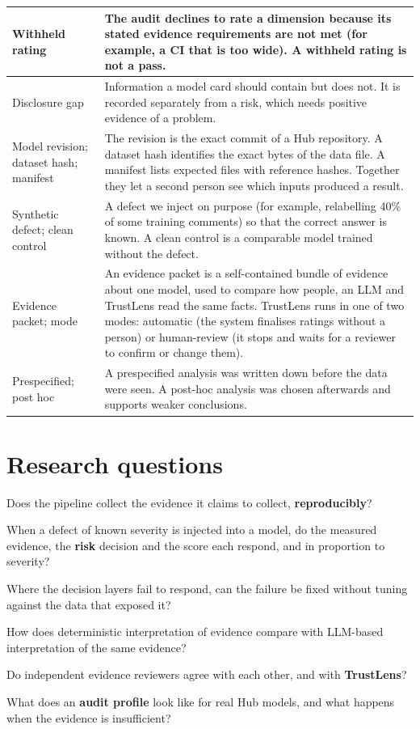 \begin{table}[!htbp]
\begin{tabularx}{\textwidth}{|>{\raggedright\arraybackslash}p{3.1cm}|L|}
Withheld rating & The audit declines to rate a dimension because its stated evidence requirements are not met (for example, a CI that is too wide). A withheld rating is not a pass.\\ \hline
Disclosure gap & Information a model card should contain but does not. It is recorded separately from a risk, which needs positive evidence of a problem.\\ \hline
Model revision; dataset hash; manifest & The revision is the exact commit of a Hub repository. A dataset hash identifies the exact bytes of the data file. A manifest lists expected files with reference hashes. Together they let a second person see which inputs produced a result.\\ \hline
Synthetic defect; clean control & A defect we inject on purpose (for example, relabelling 40\% of some training comments) so that the correct answer is known. A clean control is a comparable model trained without the defect.\\ \hline
Evidence packet; mode & An evidence packet is a self-contained bundle of evidence about one model, used to compare how people, an LLM and TrustLens read the same facts. TrustLens runs in one of two modes: automatic (the system finalises ratings without a person) or human-review (it stops and waits for a reviewer to confirm or change them).\\ \hline
Prespecified; post hoc & A prespecified analysis was written down before the data were seen. A post-hoc analysis was chosen afterwards and supports weaker conclusions.\\
\hline
\end{tabularx}
\end{table}

\section{Research questions}
\begin{description}[leftmargin=2.6em,itemsep=0.1em]
\item[\textbf{RQ1}] Does the pipeline collect the evidence it claims to collect, \textbf{reproducibly}?
\item[\textbf{RQ2}] When a defect of known severity is injected into a model, do the measured evidence, the \textbf{risk} decision and the score each respond, and in proportion to severity?
\item[\textbf{RQ3}] Where the decision layers fail to respond, can the failure be fixed without tuning against the data that exposed it?
\item[\textbf{RQ4}] How does deterministic interpretation of evidence compare with LLM-based interpretation of the same evidence?
\item[\textbf{RQ5}] Do independent evidence reviewers agree with each other, and with \textbf{TrustLens}?
\item[\textbf{RQ6}] What does an \textbf{audit profile} look like for real Hub models, and what happens when the evidence is insufficient?
\end{description}

